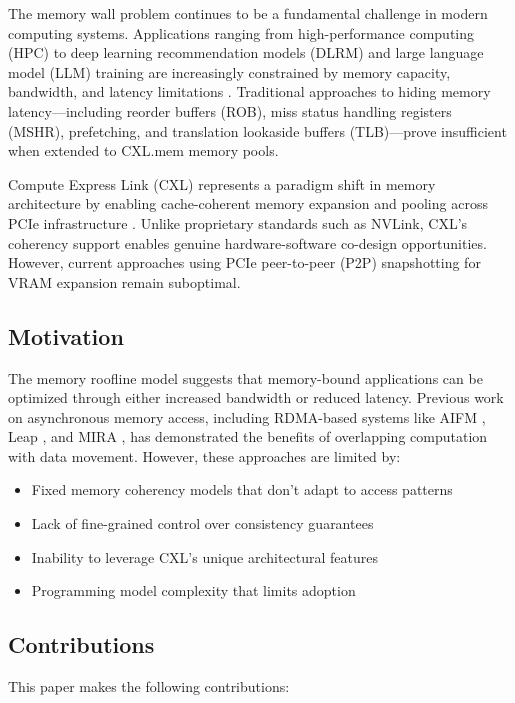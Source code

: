 \documentclass[10pt,conference]{IEEEtran}
\begin{document}
The memory wall problem continues to be a fundamental challenge in modern computing systems. Applications ranging from high-performance computing (HPC) to deep learning recommendation models (DLRM) and large language model (LLM) training are increasingly constrained by memory capacity, bandwidth, and latency limitations \cite{williams2009roofline}. Traditional approaches to hiding memory latency—including reorder buffers (ROB), miss status handling registers (MSHR), prefetching, and translation lookaside buffers (TLB)—prove insufficient when extended to CXL.mem memory pools.

Compute Express Link (CXL) represents a paradigm shift in memory architecture by enabling cache-coherent memory expansion and pooling across PCIe infrastructure \cite{cxl2024spec}. Unlike proprietary standards such as NVLink, CXL's coherency support enables genuine hardware-software co-design opportunities. However, current approaches using PCIe peer-to-peer (P2P) snapshotting for VRAM expansion remain suboptimal.

\subsection{Motivation}

The memory roofline model \cite{williams2009roofline} suggests that memory-bound applications can be optimized through either increased bandwidth or reduced latency. Previous work on asynchronous memory access, including RDMA-based systems like AIFM \cite{aifm2020}, Leap \cite{leap2020}, and MIRA \cite{mira2023}, has demonstrated the benefits of overlapping computation with data movement. However, these approaches are limited by:

\begin{itemize}
    \item Fixed memory coherency models that don't adapt to access patterns
    \item Lack of fine-grained control over consistency guarantees
    \item Inability to leverage CXL's unique architectural features
    \item Programming model complexity that limits adoption
\end{itemize}

\subsection{Contributions}

This paper makes the following contributions:
\end{document}
